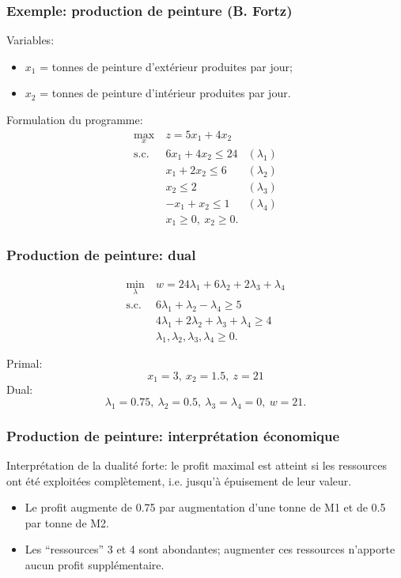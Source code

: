 \documentclass[usepdftitle=false]{beamer}
\begin{document}
\begin{frame}
	\frametitle{Exemple: production de peinture (B. Fortz)}
	
	Variables:
	\begin{itemize}
		\item
		$x_1$ = tonnes de peinture d’extérieur produites par jour;
		\item
		$x_2$ = tonnes de peinture d’intérieur produites par jour.
	\end{itemize}
	
	\mbox{}
	
	Formulation du programme:
	\begin{align*}
		\max_x \ & z = 5x_1 + 4x_2 \\
		\mbox{s.c. } & 6x_1 + 4x_2 \leq 24 & (\lambda_1) \\
		& x_1 + 2x_2 \leq 6 & (\lambda_2) \\
		& x_2 \leq 2 & (\lambda_3) \\
		& -x_1 + x_2 \leq 1 & (\lambda_4) \\
		& x_1 \geq 0,\ x_2 \geq 0.
	\end{align*}
	
\end{frame}

\begin{frame}
	\frametitle{Production de peinture: dual}
	
	\begin{align*}
		\min_\lambda \ & w = 24\lambda_1 + 6\lambda_2 + 2\lambda_3 + \lambda_4 \\
		\mbox{s.c. } & 6\lambda_1 + \lambda_2 - \lambda_4 \geq 5 \\
		&4\lambda_1 + 2\lambda_2 + \lambda_3 + \lambda_4 \geq 4 \\
		& \lambda_1, \lambda_2, \lambda_3, \lambda_4 \geq 0.
	\end{align*}
	
	\mbox{}
	
	Primal:
	\[
	x_1 = 3,\ x_2 = 1.5,\ z = 21
	\]
	Dual:
	\[
	\lambda_1 = 0.75,\ \lambda_2 = 0.5,\ \lambda_3 = \lambda_4 = 0,\ w = 21.
	\]
	
\end{frame}

\begin{frame}
	\frametitle{Production de peinture: interprétation économique}
	
	Interprétation de la dualité forte: le profit maximal est atteint si les ressources ont été exploitées complètement, i.e. jusqu’à épuisement de leur valeur.
	
	\mbox{}
	
	\begin{itemize}
		\item
		Le profit augmente de 0.75 par augmentation d'une tonne de M1 et de 0.5 par tonne de M2.
		\item
		Les ``ressources'' 3 et 4 sont abondantes; augmenter ces ressources n'apporte aucun profit supplémentaire.
	\end{itemize}
	
\end{frame}
\end{document}

